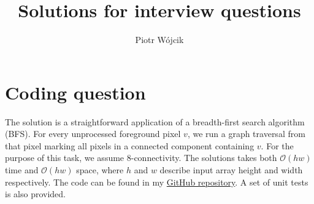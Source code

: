 \documentclass[11pt]{article}
\title{Solutions for interview questions}
\author{Piotr Wójcik}
\begin{document}
\maketitle
\section{Coding question}
The solution is a straightforward application of a breadth-first search algorithm (BFS). For every unprocessed foreground pixel $v$, 
we run a graph traversal from that pixel marking all pixels in a connected component containing $v$. For the purpose of this task, we assume $8$-connectivity.
The solutions takes both $\mathcal{O}(hw)$ time and $\mathcal{O}(hw)$ space, where $h$ and $w$ describe input array height and width respectively. 
The code can be found in my \href{https://github.com/piotrmwojcik/interview_questions}{GitHub repository}. A set of unit tests is also provided.
\end{document}
